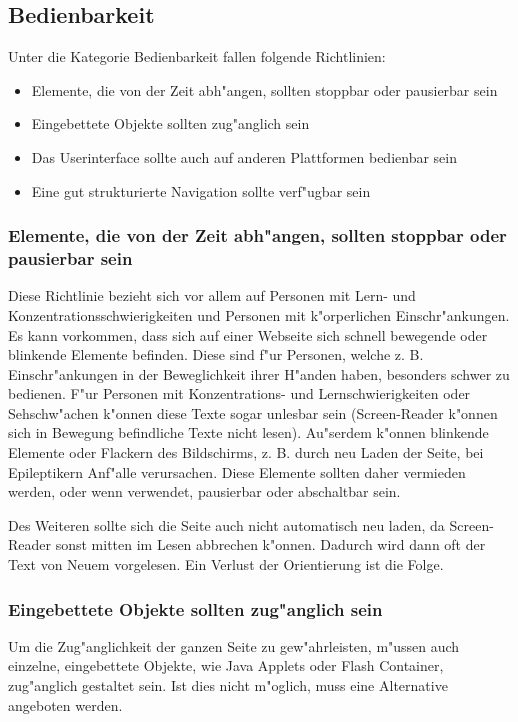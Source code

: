 \documentclass[a4paper,bibtotoc,oneside]{scrbook}
\begin{document}
\subsection{Bedienbarkeit}
Unter die Kategorie Bedienbarkeit fallen folgende Richtlinien: 

\begin{itemize}
\item Elemente, die von der Zeit abh"angen, sollten stoppbar oder pausierbar sein \cite[Abschnitt 6.7]{wcag1}
\item Eingebettete Objekte sollten zug"anglich sein\cite[Abschnitt 6.8]{wcag1}
\item Das Userinterface sollte auch auf anderen Plattformen bedienbar sein\cite[Abschnitt 6.9]{wcag1}
\item Eine gut strukturierte Navigation sollte verf"ugbar sein\cite[Abschnitt 6.13]{wcag1}
\end{itemize}

\subsubsection{Elemente, die von der Zeit abh"angen, sollten stoppbar oder pausierbar sein}
Diese Richtlinie bezieht sich vor allem auf Personen mit Lern- und Konzentrationsschwierigkeiten und Personen mit k"orperlichen Einschr"ankungen. Es kann vorkommen, dass sich auf einer Webseite sich schnell bewegende oder blinkende Elemente befinden. Diese sind f"ur Personen, welche z. B. Einschr"ankungen in der Beweglichkeit ihrer H"anden haben, besonders schwer zu bedienen. F"ur Personen mit Konzentrations- und Lernschwierigkeiten oder Sehschw"achen k"onnen diese Texte sogar unlesbar sein (Screen-Reader k"onnen sich in Bewegung befindliche Texte nicht lesen). \cite[Abschnitt 6.7]{wcag1}
Au"serdem k"onnen blinkende Elemente oder Flackern des Bildschirms, z. B. durch neu Laden der Seite, bei Epileptikern Anf"alle verursachen.
Diese Elemente sollten daher vermieden werden, oder wenn verwendet, pausierbar oder abschaltbar sein. \cite[S. 45]{barr_webd}

Des Weiteren sollte sich die Seite auch nicht automatisch neu laden, da Screen-Reader sonst mitten im Lesen abbrechen k"onnen. Dadurch wird dann oft der Text von Neuem vorgelesen. Ein Verlust der Orientierung ist die Folge. \cite[S. 45]{barr_webd}

\subsubsection{Eingebettete Objekte sollten zug"anglich sein}
Um die Zug"anglichkeit der ganzen Seite zu gew"ahrleisten, m"ussen auch einzelne, eingebettete Objekte, wie Java Applets oder Flash Container, zug"anglich gestaltet sein. Ist dies nicht m"oglich, muss eine Alternative angeboten werden. \cite[Abschnitt 6.8]{wcag1}
\end{document}
